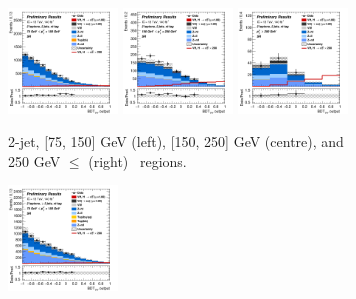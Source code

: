 \newpage

\vspace*{\fill} 

\begin{figure}[h!]
    \centering
    \begin{subfigure}[b]{\textwidth}
        \centering
        \includegraphics[width=0.32\textwidth]{Images/VH/Own_fit/prefit_VHcc/Region_distmva_BMax150_BMin75_DSR_J2_TTypext_T2_L2_Y6051_Prefit.png}
        \includegraphics[width=0.32\textwidth]{Images/VH/Own_fit/prefit_VHcc/Region_distmva_BMax250_BMin150_DSR_J2_TTypext_T2_L2_Y6051_Prefit.png}
        \includegraphics[width=0.32\textwidth]{Images/VH/Own_fit/prefit_VHcc/Region_distmva_BMin250_DSR_J2_TTypext_T2_L2_Y6051_Prefit.png}
        \caption{2-jet, [75, 150] GeV (left), [150, 250] GeV (centre), and 250  GeV $\leq$ (right) \ptv\ regions.}
        \label{fig:plots_VHcc_2L_SR_2c_2J}
    \end{subfigure}
    \begin{subfigure}[b]{\textwidth}
        \centering
        \includegraphics[width=0.32\textwidth]{Images/VH/Own_fit/prefit_VHcc/Region_distmva_BMax150_BMin75_DSR_J3_TTypext_incJet1_T2_L2_Y6051_Prefit.png}

\end{subfigure}
\end{figure}
